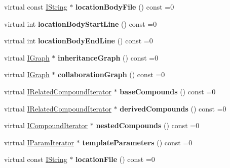 \begin{DoxyCompactItemize}
virtual const \mbox{\hyperlink{class_i_string}{I\+String}} $\ast$ {\bfseries location\+Body\+File} () const =0
\item 
\mbox{\label{class_i_class_a42c96b64901b45ad60eeba19b8c6615e}} 
virtual int {\bfseries location\+Body\+Start\+Line} () const =0
\item 
\mbox{\label{class_i_class_afc371fbe400695c90a7eb9d1bf39cc29}} 
virtual int {\bfseries location\+Body\+End\+Line} () const =0
\item 
\mbox{\label{class_i_class_a4ca5777a61f96db43cee552fae9ddf10}} 
virtual \mbox{\hyperlink{class_i_graph}{I\+Graph}} $\ast$ {\bfseries inheritance\+Graph} () const =0
\item 
\mbox{\label{class_i_class_a2d4a0dacd92ac09748c330c3c4ec8dd6}} 
virtual \mbox{\hyperlink{class_i_graph}{I\+Graph}} $\ast$ {\bfseries collaboration\+Graph} () const =0
\item 
\mbox{\label{class_i_class_ad56d72fa47a2bdd86b5e6e6ca276c310}} 
virtual \mbox{\hyperlink{class_i_related_compound_iterator}{I\+Related\+Compound\+Iterator}} $\ast$ {\bfseries base\+Compounds} () const =0
\item 
\mbox{\label{class_i_class_a13263a570c7855f31b95318a454c9d31}} 
virtual \mbox{\hyperlink{class_i_related_compound_iterator}{I\+Related\+Compound\+Iterator}} $\ast$ {\bfseries derived\+Compounds} () const =0
\item 
\mbox{\label{class_i_class_a5d0a9550c8d89d48035b51b6ca8d11d8}} 
virtual \mbox{\hyperlink{class_i_compound_iterator}{I\+Compound\+Iterator}} $\ast$ {\bfseries nested\+Compounds} () const =0
\item 
\mbox{\label{class_i_class_af0da20c3596106218074774917779d08}} 
virtual \mbox{\hyperlink{class_i_param_iterator}{I\+Param\+Iterator}} $\ast$ {\bfseries template\+Parameters} () const =0
\item 
\mbox{\label{class_i_class_a7c065c49fb1cb6e6dc35a1f1510e998f}} 
virtual const \mbox{\hyperlink{class_i_string}{I\+String}} $\ast$ {\bfseries location\+File} () const =0

\end{DoxyCompactItemize}
